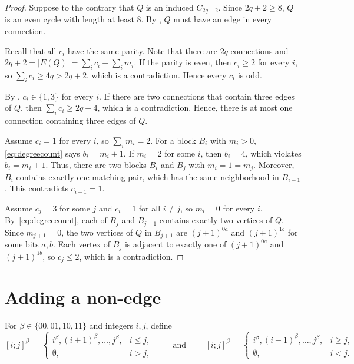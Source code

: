 \documentclass[11pt]{article}
\theoremstyle{definition}
\theoremstyle{remark}
\begin{document}
\begin{proof}
Suppose to the contrary that $Q$ is an induced $C_{2q+2}$. 
Since $2q+2\ge8$, $Q$ is an even cycle with length at least $8$. 
By , $Q$ must have an edge in every connection.

Recall that all $c_i$ have the same parity. 
Note that there are $2q$ connections and
$2q+2=|E(Q)|= \sum_i c_i+\sum_i m_i$.
If the parity is even, then  $c_i\ge2$ for every $i$, so $\sum_i c_i\ge4q>2q+2$, which is a contradiction.  
Hence every $c_i$ is odd.

By , $c_i\in\{1,3\}$ for every $i$. 
If there are two connections that contain three edges of $Q$, then $\sum_i c_i\geq 2q+4$, which is a contradiction. 
Hence, there is at most one connection containing three edges of $Q$. 

Assume $c_i=1$ for every $i$, so $\sum_i m_i=2$.
For a block $B_i$ with $m_i>0$, \eqref{eq:degreecount} says
$b_i=m_i+1$. 
If $m_i=2$ for some $i$, then $b_i=4$, which violates $b_i=m_i+1$. 
Thus, there are two blocks $B_i$ and $B_j$ with $m_i=1=m_j$.
Moreover, $B_i$ contains exactly one matching pair, which has the same neighborhood in $B_{i-1}$.  This contradicts $c_{i-1}=1$.

Assume $c_j=3$ for some $j$ and $c_i=1$ for all $i\neq j$, so $m_i=0$ for every $i$.
By~\eqref{eq:degreecount}, each of $B_j$ and $B_{j+1}$ contains exactly two vertices of $Q$. 
Since $m_{j+1}=0$, the two vertices of $Q$ in $B_{j+1}$ are $(j+1)^{0a}$ and $(j+1)^{1b}$ for some bits $a,b$. 
Each vertex of $B_j$ is adjacent to exactly one of $(j+1)^{0a}$ and $(j+1)^{1b}$, so $c_j\leq 2$, which is a contradiction. 
\end{proof}


\section{Adding a non-edge}
\label{sec:addedge}

For $\beta\in\{00,01,10,11\}$ and integers $i,j$, define
\[
[i;j]_{+}^{\beta}
=
\begin{cases}
i^\beta,(i+1)^\beta,\ldots,j^\beta,& i\le j,\\
\emptyset,& i>j,
\end{cases}
\qquad\mbox{ and }\qquad
[i;j]_{-}^{\beta}
=
\begin{cases}
i^\beta,(i-1)^\beta,\ldots,j^\beta,& i\ge j,\\
\emptyset,& i<j.
\end{cases}
\]
\end{document}
